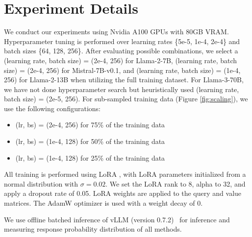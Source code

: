 \section{Experiment Details}
\label{appendix_training}
We conduct our experiments using Nvidia A100 GPUs with 80GB VRAM.
Hyperparameter tuning is performed over learning rates \{5e-5, 1e-4, 2e-4\}
and batch sizes \{64, 128, 256\}.
After evaluating possible combinations,
we select a (learning rate, batch size) = (2e-4, 256) for Llama-2-7B,
(learning rate, batch size) = (2e-4, 256) for Mistral-7B-v0.1,
and (learning rate, batch size) = (1e-4, 256) for Llama-2-13B
when utilizing the full training dataset.
For Llama-3-70B, we have not done hyperparameter search but heuristically used
(learning rate, batch size) = (2e-5, 256).
For sub-sampled training data (Figure \ref{fig:scaling}), we use the following configurations:
\begin{itemize}[leftmargin=*]
    \vspace{-7pt}
    \item (lr, bs) = (2e-4, 256) for 75\% of the training data
    \vspace{-7pt}
    \item (lr, bs) = (1e-4, 128) for 50\% of the training data
    \vspace{-7pt}
    \item (lr, bs) = (1e-4, 128) for 25\% of the training data
\end{itemize}

All training is performed using LoRA \cite{hu2021lora}, with LoRA parameters initialized from a normal distribution with $\sigma=0.02$. We set the LoRA rank to 8, alpha to 32, and apply a dropout rate of 0.05. LoRA weights are applied to the query and value matrices. The AdamW \cite{loshchilov2017decoupled} optimizer is used with a weight decay of 0.

We use offline batched inference of vLLM (version 0.7.2)~\cite{kwon2023efficient} for inference and measuring response probability distribution of all methods.


